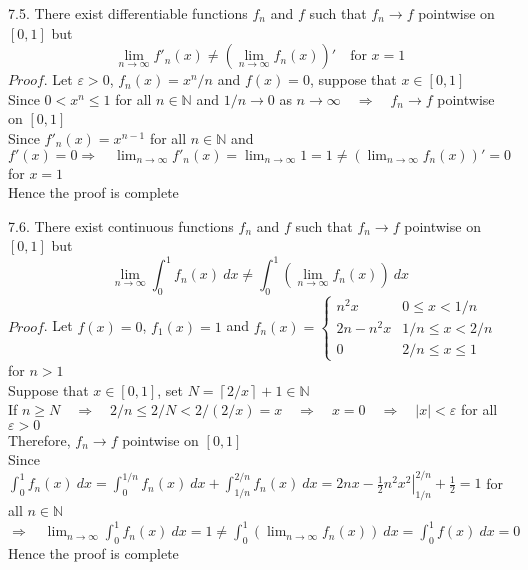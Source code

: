 \documentclass[12pt]{book}
\begin{document}
\begin{CJK}{UTF8}{bsmi}
7.5. There exist differentiable functions $f_n$ and $f$ such that $f_n\rightarrow f$ pointwise on $\left[0, 1\right]$ but 
\[
\lim_{n\rightarrow\infty}f'_n(x)\ne\left(\lim_{n\rightarrow\infty}f_n(x)\right)'\quad\text{for } x=1
\]
$Proof$. Let $\varepsilon>0$, $f_n(x)=x^n/n$ and $f(x)=0$, suppose that $x\in\left[0, 1\right]$ \\
Since $0<x^n\le1$ for all $n\in\mathbb{N}$ and $1/n\rightarrow0$ as $n\rightarrow\infty\quad\Rightarrow\quad f_n\rightarrow f$ pointwise on $\left[0, 1\right]$ \\
Since $f'_n(x)=x^{n-1}$ for all $n\in\mathbb{N}$ and $f'(x)=0\displaystyle\Rightarrow\quad\lim_{n\rightarrow\infty}f'_n(x)=\lim_{n\rightarrow\infty}1=1\ne\left(\lim_{n\rightarrow\infty}f_n(x)\right)'=0$ for $x=1$ \\
Hence the proof is complete \\

\clearpage

7.6. There exist continuous functions $f_n$ and $f$ such that $f_n\rightarrow f$ pointwise on $\left[0, 1\right]$ but \[\lim_{n\rightarrow\infty}\int_0^1f_n(x)\ dx\ne\int_0^1\left(\lim_{n\rightarrow\infty}f_n(x)\right)\ dx\]
$Proof$. Let $f(x)=0$, $f_1(x)=1$ and $\displaystyle f_n(x)=\left\{\begin{matrix}
  n^2x & 0\le x<1/n \\
  2n-n^2x & 1/n\le x<2/n \\
  0 & 2/n\le x\le1
\end{matrix}\right.$\quad for $n>1$ \\
Suppose that $x\in\left[0, 1\right]$, set $\displaystyle N=\left\lceil 2/x \right\rceil+1\in\mathbb{N}$ \\
If $n\ge N\quad\Rightarrow\quad 2/n\le2/N<2/(2/x)= x\quad\Rightarrow\quad x=0\quad\Rightarrow\quad|x|<\varepsilon$ for all $\varepsilon>0$ \\
Therefore, $f_n\rightarrow f$ pointwise on $\left[0, 1\right]$ \\
Since $\displaystyle\int_0^1f_n(x)\ dx=\int_0^{1/n}f_n(x)\ dx+\int_{1/n}^{2/n}f_n(x)\ dx=\left.2nx-\frac{1}{2}n^2x^2\right|_{1/n}^{2/n}+\frac{1}{2}=1$ for all $n\in\mathbb{N}$ \\
$\displaystyle\Rightarrow\quad\lim_{n\rightarrow\infty}\int_0^1f_n(x)\ dx=1\ne\int_0^1\left(\lim_{n\rightarrow\infty}f_n(x)\right)\ dx=\int_0^1f(x)\ dx=0$ \\
Hence the proof is complete \\


\end{CJK}
\end{document}
